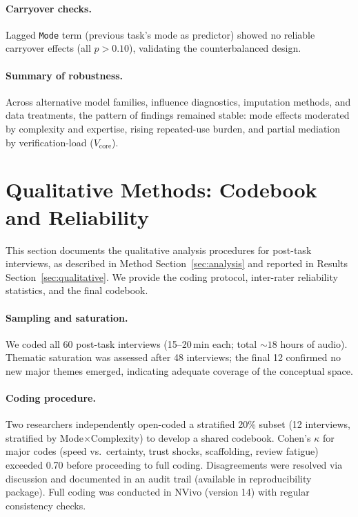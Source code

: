 \documentclass[sigconf]{acmart}
\begin{document}
\paragraph{Carryover checks.}
Lagged \texttt{Mode} term (previous task's mode as predictor) showed no reliable carryover effects (all \(p>0.10\)), validating the counterbalanced design.

\paragraph{Summary of robustness.}
Across alternative model families, influence diagnostics, imputation methods, and data treatments, the pattern of findings remained stable: mode effects moderated by complexity and expertise, rising repeated-use burden, and partial mediation by verification-load ($V_{\text{core}}$).


\section{Qualitative Methods: Codebook and Reliability}
\label{app:qual-codebook}

This section documents the qualitative analysis procedures for post-task interviews, as described in Method Section~\ref{sec:analysis} and reported in Results Section~\ref{sec:qualitative}. We provide the coding protocol, inter-rater reliability statistics, and the final codebook.

\paragraph{Sampling and saturation.}
We coded all 60 post-task interviews (15--20\,min each; total ${\sim}18$ hours of audio). Thematic saturation was assessed after 48 interviews; the final 12 confirmed no new major themes emerged, indicating adequate coverage of the conceptual space.

\paragraph{Coding procedure.}
Two researchers independently open-coded a stratified 20\% subset (12 interviews, stratified by Mode\(\times\)Complexity) to develop a shared codebook. Cohen's \(\kappa\) for major codes (speed vs.\ certainty, trust shocks, scaffolding, review fatigue) exceeded 0.70 before proceeding to full coding. Disagreements were resolved via discussion and documented in an audit trail (available in reproducibility package). Full coding was conducted in NVivo (version 14) with regular consistency checks.
\end{document}
